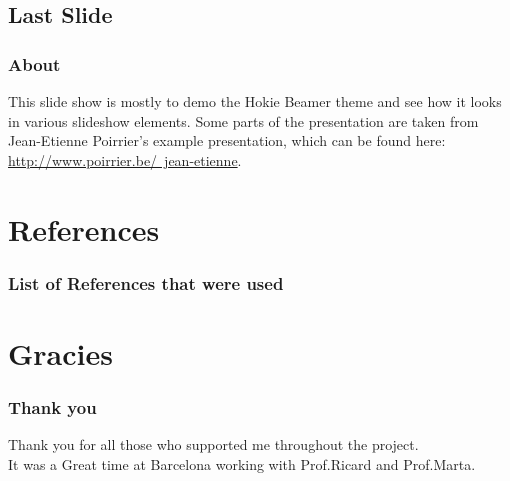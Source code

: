 \documentclass{beamer}
\begin{document}
\subsection{Last Slide}

\frame
{
	\frametitle{About}

	This slide show is mostly to demo the Hokie Beamer theme and see how it looks in various slideshow elements.  Some parts of the presentation are taken from Jean-Etienne Poirrier's example presentation, which can be found here:  \href{http://www.poirrier.be/~jean-etienne}{http://www.poirrier.be/~jean-etienne}.
	
	

{}
}

\section{References}

\frame
{
	\frametitle{List of References that were used}


{}
}
\section{Gracies}

\frame
{
	\frametitle{Thank you}
Thank you for all those who supported me throughout the project.\\
It was a Great time at Barcelona working with Prof.Ricard and Prof.Marta.

{}
}
\end{document}
